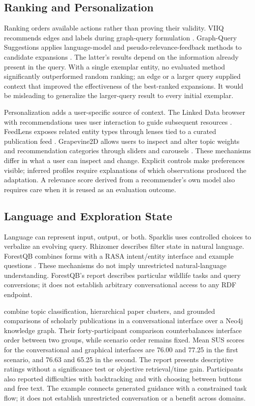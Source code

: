 \documentclass[manuscript,review,screen]{acmart}
\begin{document}
\subsection{Ranking and Personalization}
Ranking orders available actions rather than proving their validity. VIIQ recommends edges and labels during graph-query formulation \citep{2015_Jayaram_VIIQ_auto-suggestion}. Graph-Query Suggestions applies language-model and pseudo-relevance-feedback methods to candidate expansions \citep{2020_Lissandrini_Graph-Query_Suggestions}. The latter's results depend on the information already present in the query. With a single exemplar entity, no evaluated method significantly outperformed random ranking; an edge or a larger query supplied context that improved the effectiveness of the best-ranked expansions. It would be misleading to generalize the larger-query result to every initial exemplar.

Personalization adds a user-specific source of context. The Linked Data browser with recommendations uses user interaction to guide subsequent resources \citep{2018_Durao_A_Linked}. FeedLens exposes related entity types through lenses tied to a curated publication feed \citep{V3-01126}. Grapevine2D allows users to inspect and alter topic weights and recommendation categories through sliders and carousels \citep{V3-00694}. These mechanisms differ in what a user can inspect and change. Explicit controls make preferences visible; inferred profiles require explanations of which observations produced the adaptation. A relevance score derived from a recommender's own model also requires care when it is reused as an evaluation outcome.

\subsection{Language and Exploration State}
Language can represent input, output, or both. Sparklis uses controlled choices to verbalize an evolving query. Rhizomer describes filter state in natural language. ForestQB combines forms with a RASA intent/entity interface and example questions \citep{2017_Ferre_Sparklis_An,V3-01105,V3-01155}. These mechanisms do not imply unrestricted natural-language understanding. ForestQB's report describes particular wildlife tasks and query conversions; it does not establish arbitrary conversational access to any RDF endpoint.

\citet{V3-00696} combine topic classification, hierarchical paper clusters, and grounded comparisons of scholarly publications in a conversational interface over a Neo4j knowledge graph. Their forty-participant comparison counterbalances interface order between two groups, while scenario order remains fixed. Mean SUS scores for the conversational and graphical interfaces are 76.00 and 77.25 in the first scenario, and 76.63 and 65.25 in the second. The report presents descriptive ratings without a significance test or objective retrieval/time gain. Participants also reported difficulties with backtracking and with choosing between buttons and free text. The example connects generated guidance with a constrained task flow; it does not establish unrestricted conversation or a benefit across domains.
\end{document}
